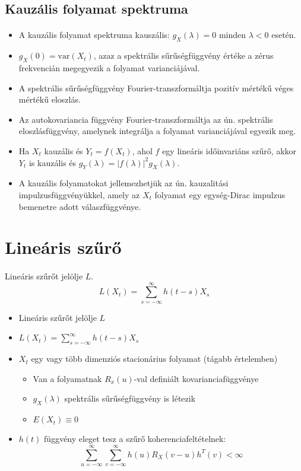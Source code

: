 \documentclass[11pt,a4pape,draftr]{article}
\begin{document}
				\subsection{Kauzális folyamat spektruma}
					\paragraph{}
					\begin{itemize}
						\item A kauzális folyamat spektruma kauszális: $g_X(\lambda) = 0$ minden $\lambda < 0$ esetén.
						\item $g_X(0) = \text{var}(X_t)$, azaz a spektrális sűrűségfüggvény értéke a zérus frekvencián megegyezik a folyamat varianciájával.
						\item A spektrális sűrűségfüggvény Fourier-transzformáltja pozitív mértékű véges mértékű eloszlás.
						\item Az autokovariancia függvény Fourier-transzformáltja az ún. spektrális eloszlásfüggvény, amelynek integrálja a folyamat varianciájával egyezik meg.
						\item Ha $X_t$ kauzális és $Y_t = f(X_t)$, ahol $f$ egy lineáris időinvariáns szűrő, akkor $Y_t$ is kauzális és $g_Y(\lambda) = |f(\lambda)|^2 g_X(\lambda)$.
						\item A kauzális folyamatokat jellemezhetjük az ún. kauzalitási impulzusfüggvényükkel, amely az $X_t$ folyamat egy egység-Dirac impulzus bemenetre adott válaszfüggvénye.
					\end{itemize}
			\section{Lineáris szűrő}
				\paragraph{}
					Lineáris szűrőt jelölje $L$.
					$$L(X_t) = \sum_{s = -\infty}^\infty h(t-s)X_s$$
					
					\begin{itemize}
					  \item Lineáris szűrőt jelölje $L$
					  \item $L(X_t) = \sum_{s = -\infty}^\infty h(t-s)X_s$
					  \item $X_t$ egy vagy több dimenziós stacionárius folyamat (tágabb értelemben)
					  \begin{itemize}
						    \item Van a folyamatnak $R_x(u)$-val definiált kovarianciafüggvénye
						    \item $g_X(\lambda)$ spektrális sűrűségfüggvény is létezik
						    \item $E(X_t) \equiv 0$
					  \end{itemize}
					  \item $h(t)$ függvény eleget tesz a szűrő koherenciafeltételnek: 
					  $$\sum_{u = -\infty} ^\infty \sum_{v = -\infty}^\infty h(u) R_X(v-u) h^T(v) < \infty$$
					\end{itemize}
\end{document}
